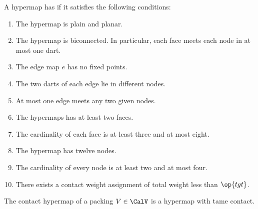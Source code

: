\begin{definition}
  A hypermap has  if it satisfies the following 
  conditions:
%
%
%
%
%
%
%
%
%
\begin{enumerate}
\item {} The hypermap is plain and planar.
\item {} The hypermap is biconnected.  In particular,
  each face meets each node in at most one dart.
\item {} The edge map $e$ has no fixed points.
\item {} The two darts of each edge lie in different
  nodes.
\item {} At most one edge meets any two given
  nodes.
\item {} The hypermaps has at least two faces.
\item {} The cardinality of each face is at least three
  and at most eight.
\item {} The hypermap has twelve nodes.
\item {} The cardinality of every node is at least two  and at most four.
\item {} There exists a contact weight assignment of total
  weight less than $\op{tgt}$.
\end{enumerate}
%
\end{definition}



\begin{theorem} The contact hypermap of a 
  packing $V\in \CalV$ is a hypermap with tame contact.
\end{theorem}
%
%
%
%


